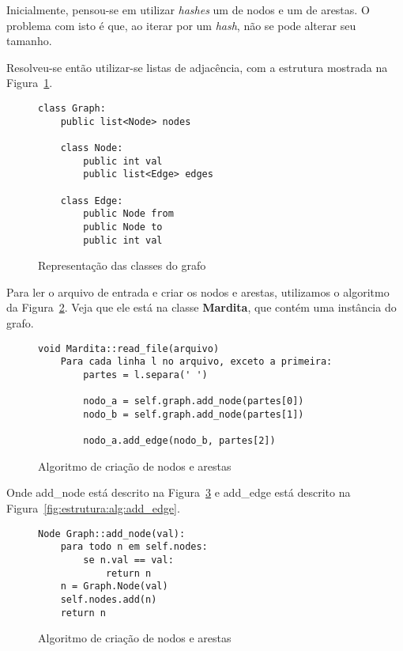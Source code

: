 \documentclass[12pt]{article}
\begin{document}
Inicialmente, pensou-se em utilizar \textit{hashes} um de nodos e um de arestas.
O problema com isto é que, ao iterar por um \textit{hash}, não se pode alterar
seu tamanho.

Resolveu-se então utilizar-se listas de adjacência, com a estrutura mostrada na
Figura~\ref{fig:estrutura:classes}.

\begin{figure}[htb!]
    \begin{lstlisting}
class Graph:
    public list<Node> nodes

    class Node:
        public int val
        public list<Edge> edges

    class Edge:
        public Node from
        public Node to
        public int val
    \end{lstlisting}
  \caption{Representação das classes do grafo}
\label{fig:estrutura:classes}
\end{figure}

Para ler o arquivo de entrada e criar os nodos e arestas, utilizamos o algoritmo
da Figura~\ref{fig:estrutura:alg:leitura}. Veja que ele está na classe
\textsf{\textbf{Mardita}}, que contém uma instância do grafo.

\begin{figure}[htb!]
  \centering
\begin{lstlisting}
void Mardita::read_file(arquivo)
    Para cada linha l no arquivo, exceto a primeira:
        partes = l.separa(' ')

        nodo_a = self.graph.add_node(partes[0])
        nodo_b = self.graph.add_node(partes[1])

        nodo_a.add_edge(nodo_b, partes[2])
\end{lstlisting}
  \caption{Algoritmo de criação de nodos e arestas}
\label{fig:estrutura:alg:leitura}
\end{figure}

Onde \textsf{add\_node} está descrito na Figura~\ref{fig:estrutura:alg:add_node}
e \textsf{add\_edge} está descrito na Figura~\ref{fig:estrutura:alg:add_edge}.

\begin{figure}[htb!]
  \centering
\begin{lstlisting}
Node Graph::add_node(val):
    para todo n em self.nodes:
        se n.val == val:
            return n
    n = Graph.Node(val)
    self.nodes.add(n)
    return n
\end{lstlisting}
  \caption{Algoritmo de criação de nodos e arestas}
\label{fig:estrutura:alg:add_node}
\end{figure}
\end{document}
